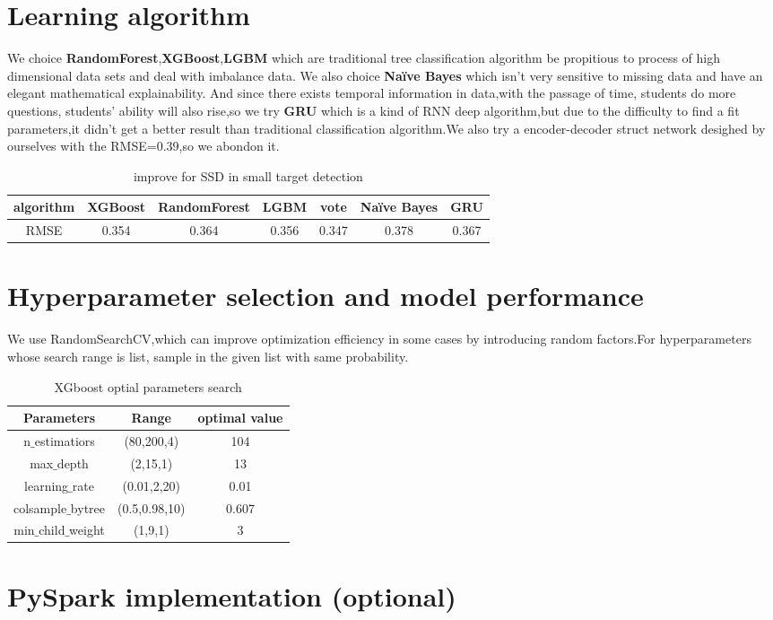 \documentclass{article}
\begin{document}
	\section{Learning algorithm}
	We choice \textbf{RandomForest},\textbf{XGBoost},\textbf{LGBM} which are traditional tree classification algorithm be propitious to process of high dimensional data sets and deal with imbalance data.
	We also choice \textbf{Naïve Bayes} which isn't very sensitive to missing data and have an elegant mathematical explainability.
	And since there exists temporal information in data,with the passage of time, students do more questions, students' ability will also rise,so we try \textbf{GRU} which is a kind of RNN deep algorithm,but due to the difficulty to find a fit parameters,it didn't get a better result than traditional classification algorithm.We also try a encoder-decoder struct network desighed by ourselves with the RMSE=0.39,so we abondon it.
	\begin{table}[htb]
		\centering
		\caption{improve for SSD in small target detection}
		\label{table1}
		\begin{tabular}{|c|c|c|c|c|c|c|}
			\hline
			{algorithm} & {XGBoost} & {RandomForest} & {LGBM} & {vote} &{Naïve Bayes} &{GRU}\\
			\hline
			
			{RMSE} &{0.354}	&{0.364}	&{0.356}	&{0.347}	&{0.378} &{0.367}\\ 
			\hline
			
		\end{tabular}
		\label{performance of each algorithm}
	\end{table}
	
	\section{Hyperparameter selection and model performance}
	We use RandomSearchCV,which can improve optimization efficiency in some cases by introducing random factors.For hyperparameters whose search range is list, sample in the given list with same probability.
	
	
	\begin{table}[htb]
		\centering
		\caption{XGboost optial parameters search}
		\label{table1}
		\begin{tabular}{|c|c|c|}
			\hline
			{Parameters} & {Range} & {optimal value}\\
			\hline
			{ n$\_$estimatiors} & {(80,200,4)} & {104} \\
			\hline
			{ max$\_$depth } & {(2,15,1)} & {13} \\
			\hline
			{  learning$\_$rate  } & {(0.01,2,20)} & {0.01} \\
			\hline
			{  colsample$\_$bytree} & {(0.5,0.98,10)} &  { 0.607 } \\
			\hline
			{  min$\_$child$\_$weight  } & {(1,9,1)} & {3} \\
			\hline
		\end{tabular}
		\label{performance of each algorithm}
	\end{table}
	
	\section{PySpark implementation (optional)}
\end{document}
